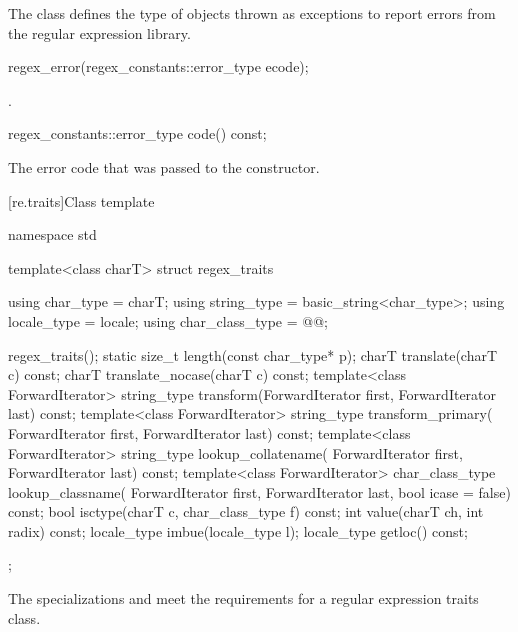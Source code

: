 \pnum
The class  defines the type of objects thrown as
exceptions to report errors from the regular expression library.

%
\begin{itemdecl}
regex_error(regex_constants::error_type ecode);
\end{itemdecl}

\begin{itemdescr}
\pnum
\ensures
{}.
\end{itemdescr}

%
%
\begin{itemdecl}
regex_constants::error_type code() const;
\end{itemdecl}

\begin{itemdescr}
\pnum
\returns
The error code that was passed to the constructor.
\end{itemdescr}

[re.traits]{Class template }
%
\begin{codeblock}
namespace std {
  template<class charT>
    struct regex_traits {
      using char_type       = charT;
      using string_type     = basic_string<char_type>;
      using locale_type     = locale;
      using char_class_type = @@;

      regex_traits();
      static size_t length(const char_type* p);
      charT translate(charT c) const;
      charT translate_nocase(charT c) const;
      template<class ForwardIterator>
        string_type transform(ForwardIterator first, ForwardIterator last) const;
      template<class ForwardIterator>
        string_type transform_primary(
          ForwardIterator first, ForwardIterator last) const;
      template<class ForwardIterator>
        string_type lookup_collatename(
          ForwardIterator first, ForwardIterator last) const;
      template<class ForwardIterator>
        char_class_type lookup_classname(
          ForwardIterator first, ForwardIterator last, bool icase = false) const;
      bool isctype(charT c, char_class_type f) const;
      int value(charT ch, int radix) const;
      locale_type imbue(locale_type l);
      locale_type getloc() const;
    };
}
\end{codeblock}

\pnum
{}%
%
%
The specializations  and
 meet the
requirements for a regular expression traits class.

